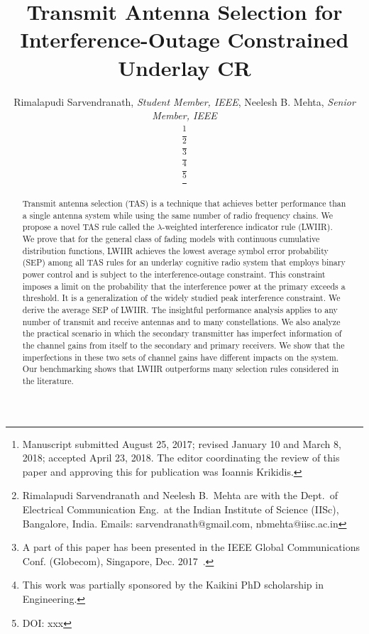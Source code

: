\documentclass[journal]{IEEEtran}
\newcommand{\lam}{\lambda}
\begin{document}
\title{Transmit Antenna Selection for Interference-Outage Constrained Underlay CR}

\author{Rimalapudi Sarvendranath, {\it Student Member, IEEE}, Neelesh B. Mehta, {\it Senior Member, IEEE}


\thanks{Manuscript submitted August 25, 2017; revised January 10 and March 8, 2018; accepted April 23, 2018. The editor coordinating the review of this paper and approving this for publication was Ioannis Krikidis. }

\thanks{Rimalapudi Sarvendranath and Neelesh B.\ Mehta are with the
		Dept.\ of Electrical Communication Eng.\ at the Indian Institute of
		Science (IISc), Bangalore, India. Emails:
		sarvendranath@gmail.com, nbmehta@iisc.ac.in}
	
\thanks{A part of this paper has been presented in the IEEE Global
		Communications Conf. (Globecom), Singapore, Dec. 2017~\cite{Sarvendranath_2017_globecom}.} 
	
\thanks{This work was partially sponsored by the Kaikini PhD scholarship in Engineering.}

\thanks{DOI: xxx}

}


\setcounter{page}{1}

\maketitle

\begin{abstract}
	Transmit antenna selection (TAS) is a technique that achieves better performance than a single
	antenna system while using the same number of radio frequency chains. We propose a novel TAS
	rule called the $\lam$-weighted interference indicator rule (LWIIR). We prove that for the general class of fading models with continuous cumulative distribution functions, LWIIR achieves the lowest average symbol error probability (SEP) among all TAS rules for  an underlay cognitive radio system that employs binary power control and is subject to the interference-outage constraint. This constraint imposes a limit on the probability that the interference power at the primary exceeds a threshold. It is a generalization of the widely studied peak interference constraint. We derive the average SEP of LWIIR. The insightful performance analysis applies to any number of transmit and receive antennas and to many constellations.  We also analyze the practical scenario in which the secondary transmitter has imperfect information of the channel gains from itself to the secondary and primary receivers. We show that the imperfections in these two sets of channel gains have different impacts on the system. Our benchmarking shows that LWIIR outperforms many selection rules considered in the literature.
\end{abstract}
\end{document}
